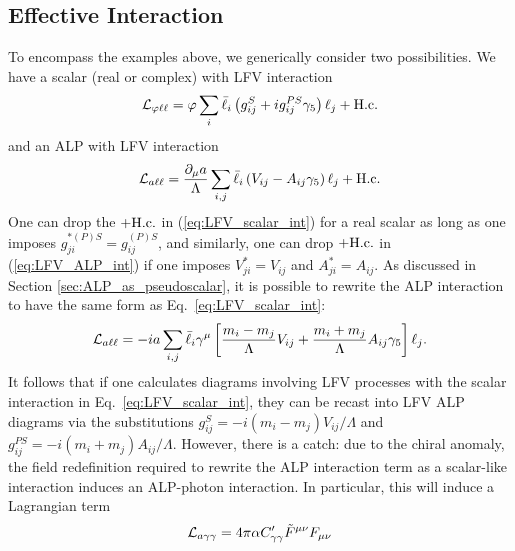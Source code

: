 \subsection{Effective Interaction}\label{sec:lfv_eft}
To encompass the examples above, we generically consider two possibilities. We have a scalar (real or complex) with LFV interaction
\begin{align}
    {\cal L}_{\varphi \ell\ell} = \varphi\sum_{i}\bar{\ell}_i \left(g_{ij}^S + ig_{ij}^{PS}\gamma_5\right)\ell_j + {\rm H.c.}\label{eq:LFV_scalar_int}
\end{align}
and an ALP with LFV interaction 
\begin{align}
    {\cal L}_{a\ell\ell} = \frac{\partial_\mu a}{\Lambda}\sum_{i,j}\bar{\ell}_i \left(V_{ij} - A_{ij}\gamma_5\right)\ell_j + {\rm H.c.}\label{eq:LFV_ALP_int}
\end{align}
One can drop the $+{\rm H.c.}$ in (\ref{eq:LFV_scalar_int}) for a real scalar as long as one imposes $g_{ji}^{*(P)S} = g_{ij}^{(P)S}$, and similarly, one can drop $+{\rm H.c.}$ in (\ref{eq:LFV_ALP_int}) if one imposes $V_{ji}^* = V_{ij}$ and $A_{ji}^* = A_{ij}$. As discussed in Section \ref{sec:ALP_as_pseudoscalar}, it is possible to  rewrite the ALP interaction to have the same form as Eq.~\ref{eq:LFV_scalar_int}:
\begin{align}
    {\cal L}_{a\ell\ell} = -ia\sum_{i, j}\bar{\ell}_i\gamma^\mu\left[\frac{m_i - m_j}{\Lambda}V_{ij} + \frac{m_i + m_j}{\Lambda}A_{ij}\gamma_5\right]\ell_j.\label{eq:LFV_ALP_as_scalar}
\end{align}
It follows that if one calculates diagrams involving LFV processes with the scalar interaction in Eq.~\ref{eq:LFV_scalar_int}, they can be recast into LFV ALP diagrams via the substitutions $g_{ij}^S = -i(m_i - m_j)V_{ij}/\Lambda$ and $g_{ij}^{PS} = -i(m_i + m_j)A_{ij}/\Lambda$. However, there is a catch: due to the chiral anomaly, the field redefinition required to rewrite the ALP interaction term as a scalar-like interaction induces an ALP-photon interaction. In particular, this will induce a Lagrangian term
\begin{align}
    {\cal L}_{a\gamma\gamma} = 4\pi\alpha C'_{\gamma\gamma}\tilde{F}^{\mu\nu}F_{\mu\nu}
\end{align}
